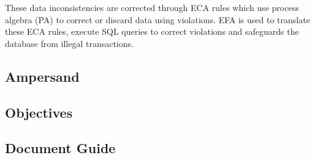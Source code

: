 \documentclass[journal,12pt,onecolumn,draftclsnofoot]{IEEEtran} %
\let\Oldsubsection\subsection
\renewcommand{\subsection}{\FloatBarrier\Oldsubsection}
\begin{document}
These data inconsistencies are corrected through ECA rules which use process 
algebra (PA) to correct or discard data using violations. EFA is used to 
translate these ECA rules, execute SQL queries to correct violations and 
safeguards the database from illegal transactions.
\subsection*{Ampersand}
\subsection*{Objectives}
\subsection*{Document Guide}
\end{document}
